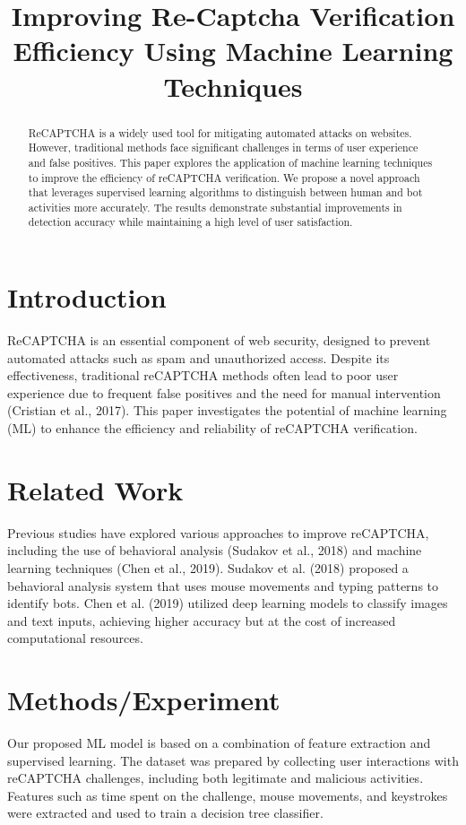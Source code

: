 \documentclass{article}
\title{Improving Re-Captcha Verification Efficiency Using Machine Learning Techniques}
\author{}
\date{}
\begin{document}
\maketitle

\begin{abstract}
ReCAPTCHA is a widely used tool for mitigating automated attacks on websites. However, traditional methods face significant challenges in terms of user experience and false positives. This paper explores the application of machine learning techniques to improve the efficiency of reCAPTCHA verification. We propose a novel approach that leverages supervised learning algorithms to distinguish between human and bot activities more accurately. The results demonstrate substantial improvements in detection accuracy while maintaining a high level of user satisfaction.
\end{abstract}

\section{Introduction}
ReCAPTCHA is an essential component of web security, designed to prevent automated attacks such as spam and unauthorized access. Despite its effectiveness, traditional reCAPTCHA methods often lead to poor user experience due to frequent false positives and the need for manual intervention (Cristian et al., 2017). This paper investigates the potential of machine learning (ML) to enhance the efficiency and reliability of reCAPTCHA verification.

\section{Related Work}
Previous studies have explored various approaches to improve reCAPTCHA, including the use of behavioral analysis (Sudakov et al., 2018) and machine learning techniques (Chen et al., 2019). Sudakov et al. (2018) proposed a behavioral analysis system that uses mouse movements and typing patterns to identify bots. Chen et al. (2019) utilized deep learning models to classify images and text inputs, achieving higher accuracy but at the cost of increased computational resources.

\section{Methods/Experiment}
Our proposed ML model is based on a combination of feature extraction and supervised learning. The dataset was prepared by collecting user interactions with reCAPTCHA challenges, including both legitimate and malicious activities. Features such as time spent on the challenge, mouse movements, and keystrokes were extracted and used to train a decision tree classifier.
\end{document}
